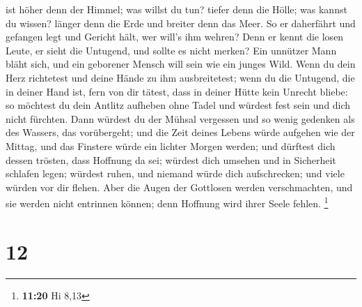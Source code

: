 ist höher denn der Himmel; was willst du tun? tiefer denn die Hölle; was
kannst du wissen?  länger denn die Erde und breiter denn das
Meer.  So er daherfährt und gefangen legt und Gericht hält,
wer will's ihm wehren?  Denn er kennt die losen Leute, er
sieht die Untugend, und sollte es nicht merken?  Ein
unnützer Mann bläht sich, und ein geborener Mensch will sein wie ein
junges Wild.  Wenn du dein Herz richtetest und deine Hände
zu ihm ausbreitetest;  wenn du die Untugend, die in deiner
Hand ist, fern von dir tätest, dass in deiner Hütte kein Unrecht bliebe:
 so möchtest du dein Antlitz aufheben ohne Tadel und
würdest fest sein und dich nicht fürchten.  Dann würdest du
der Mühsal vergessen und so wenig gedenken als des Wassers, das
vorübergeht;  und die Zeit deines Lebens würde aufgehen wie
der Mittag, und das Finstere würde ein lichter Morgen werden;
 und dürftest dich dessen trösten, dass Hoffnung da sei;
würdest dich umsehen und in Sicherheit schlafen legen; 
würdest ruhen, und niemand würde dich aufschrecken; und viele würden vor
dir flehen.  Aber die Augen der Gottlosen werden
verschmachten, und sie werden nicht entrinnen können; denn Hoffnung wird
ihrer Seele fehlen. \footnote{\textbf{11:20} Hi 8,13}

\hypertarget{section-1}{%
\section{12}\label{section-1}}

